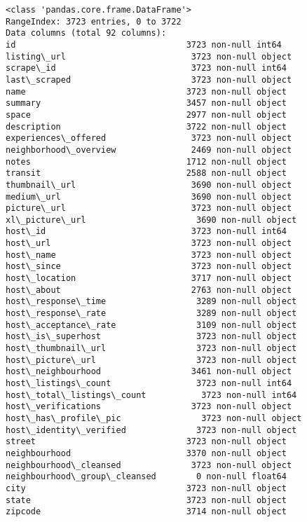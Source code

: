 \documentclass[11pt]{article}
\begin{document}
    \begin{Verbatim}[commandchars=\\\{\}]
<class 'pandas.core.frame.DataFrame'>
RangeIndex: 3723 entries, 0 to 3722
Data columns (total 92 columns):
id                                  3723 non-null int64
listing\_url                         3723 non-null object
scrape\_id                           3723 non-null int64
last\_scraped                        3723 non-null object
name                                3723 non-null object
summary                             3457 non-null object
space                               2977 non-null object
description                         3722 non-null object
experiences\_offered                 3723 non-null object
neighborhood\_overview               2469 non-null object
notes                               1712 non-null object
transit                             2588 non-null object
thumbnail\_url                       3690 non-null object
medium\_url                          3690 non-null object
picture\_url                         3723 non-null object
xl\_picture\_url                      3690 non-null object
host\_id                             3723 non-null int64
host\_url                            3723 non-null object
host\_name                           3723 non-null object
host\_since                          3723 non-null object
host\_location                       3717 non-null object
host\_about                          2763 non-null object
host\_response\_time                  3289 non-null object
host\_response\_rate                  3289 non-null object
host\_acceptance\_rate                3109 non-null object
host\_is\_superhost                   3723 non-null object
host\_thumbnail\_url                  3723 non-null object
host\_picture\_url                    3723 non-null object
host\_neighbourhood                  3461 non-null object
host\_listings\_count                 3723 non-null int64
host\_total\_listings\_count           3723 non-null int64
host\_verifications                  3723 non-null object
host\_has\_profile\_pic                3723 non-null object
host\_identity\_verified              3723 non-null object
street                              3723 non-null object
neighbourhood                       3370 non-null object
neighbourhood\_cleansed              3723 non-null object
neighbourhood\_group\_cleansed        0 non-null float64
city                                3723 non-null object
state                               3723 non-null object
zipcode                             3714 non-null object

\end{Verbatim}
\end{document}
